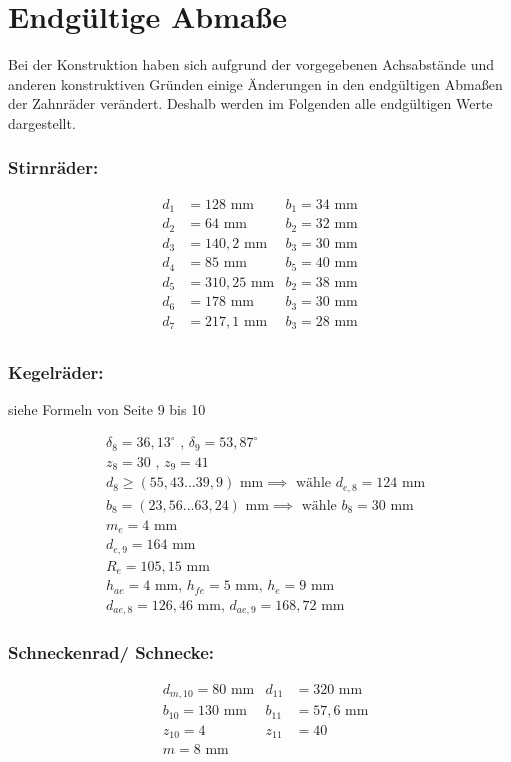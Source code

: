 \section{Endgültige Abmaße}
Bei der Konstruktion haben sich aufgrund der vorgegebenen Achsabstände und anderen konstruktiven Gründen einige Änderungen in den endgültigen Abmaßen der Zahnräder verändert. Deshalb werden im Folgenden alle endgültigen Werte dargestellt.
\subsubsection{Stirnräder:}
\begin{align*}
	d_1 &= 128\text{ mm} & b_1= 34\text{ mm}\\
	d_2 &= 64\text{ mm} & b_2= 32\text{ mm}\\
	d_3 &= 140,2\text{ mm} & b_3= 30\text{ mm}\\
	d_4 &= 85\text{ mm} & b_5= 40\text{ mm}\\
	d_5 &= 310,25\text{ mm} & b_2= 38\text{ mm}\\
	d_6 &= 178\text{ mm} & b_3= 30\text{ mm}\\
	d_7 &= 217,1\text{ mm} & b_3= 28\text{ mm}\\
\end{align*}
\subsubsection{Kegelräder:}
siehe Formeln von Seite 9 bis 10

\begin{align*}
	&\delta_8 = 36,13 ^\circ \text{ , } \delta_9 = 53,87 ^\circ \\
	&z_8 = 30 \text{ , } z_9 = 41\\
	&d_8 \ge (55,43...39,9) \text{ mm} \implies \text{ wähle } d_{e,8} = 124 \text{ mm}\\
	&b_8 = (23,56...63,24) \text{ mm} \implies \text{ wähle } b_8 = 30 \text{ mm}\\
	&m_e = 4 \text{ mm}\\
	&d_{e,9} = 164 \text{ mm}\\
	&R_e = 105,15 \text{ mm}\\
	&h_{ae} = 4 \text{ mm, } 	h_{fe} = 5 \text{ mm, } h_{e} = 9 \text{ mm}\\
	&d_{ae,8} = 126,46 \text{ mm, } d_{ae,9} = 168,72 \text{ mm }
\end{align*}

\subsubsection{Schneckenrad/ Schnecke:}
\begin{align*}
&d_{m,10} = 80\text{ mm} &d_{11} &= 320\text{ mm}\\
&b_{10} = 130\text{ mm} & b_{11} &= 57,6\text{ mm}\\
&z_{10} = 4 &z_{11} &=40\\
&m = 8\text{ mm} &\\
\end{align*}

